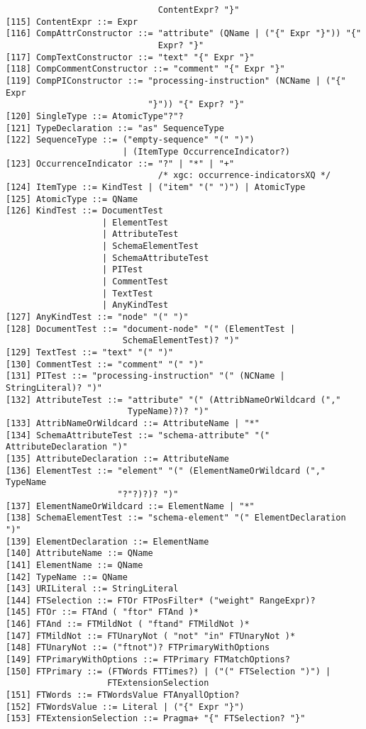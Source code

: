 \begin{verbatim}
                              ContentExpr? "}" 
[115] ContentExpr ::= Expr
[116] CompAttrConstructor ::= "attribute" (QName | ("{" Expr "}")) "{"
                              Expr? "}"  
[117] CompTextConstructor ::= "text" "{" Expr "}"
[118] CompCommentConstructor ::= "comment" "{" Expr "}"
[119] CompPIConstructor ::= "processing-instruction" (NCName | ("{" Expr
                            "}")) "{" Expr? "}" 
[120] SingleType ::= AtomicType"?"? 
[121] TypeDeclaration ::= "as" SequenceType
[122] SequenceType ::= ("empty-sequence" "(" ")")
                       | (ItemType OccurrenceIndicator?)
[123] OccurrenceIndicator ::= "?" | "*" | "+"	
                              /* xgc: occurrence-indicatorsXQ */
[124] ItemType ::= KindTest | ("item" "(" ")") | AtomicType
[125] AtomicType ::= QName
[126] KindTest ::= DocumentTest
                   | ElementTest
                   | AttributeTest
                   | SchemaElementTest
                   | SchemaAttributeTest
                   | PITest
                   | CommentTest
                   | TextTest
                   | AnyKindTest
[127] AnyKindTest ::= "node" "(" ")"
[128] DocumentTest ::= "document-node" "(" (ElementTest |
                       SchemaElementTest)? ")" 
[129] TextTest ::= "text" "(" ")"
[130] CommentTest ::= "comment" "(" ")"
[131] PITest ::= "processing-instruction" "(" (NCName | StringLiteral)? ")"
[132] AttributeTest ::= "attribute" "(" (AttribNameOrWildcard (","
                        TypeName)?)? ")"
[133] AttribNameOrWildcard ::= AttributeName | "*"
[134] SchemaAttributeTest ::= "schema-attribute" "(" AttributeDeclaration ")" 
[135] AttributeDeclaration ::= AttributeName
[136] ElementTest ::= "element" "(" (ElementNameOrWildcard ("," TypeName
                      "?"?)?)? ")" 
[137] ElementNameOrWildcard ::= ElementName | "*"
[138] SchemaElementTest ::= "schema-element" "(" ElementDeclaration ")"
[139] ElementDeclaration ::= ElementName
[140] AttributeName ::= QName
[141] ElementName ::= QName
[142] TypeName ::= QName
[143] URILiteral ::= StringLiteral
[144] FTSelection ::= FTOr FTPosFilter* ("weight" RangeExpr)?
[145] FTOr ::= FTAnd ( "ftor" FTAnd )*
[146] FTAnd ::= FTMildNot ( "ftand" FTMildNot )*
[147] FTMildNot ::= FTUnaryNot ( "not" "in" FTUnaryNot )*
[148] FTUnaryNot ::= ("ftnot")? FTPrimaryWithOptions
[149] FTPrimaryWithOptions ::= FTPrimary FTMatchOptions?
[150] FTPrimary ::= (FTWords FTTimes?) | ("(" FTSelection ")") |
                    FTExtensionSelection 
[151] FTWords ::= FTWordsValue FTAnyallOption?
[152] FTWordsValue ::= Literal | ("{" Expr "}")
[153] FTExtensionSelection ::= Pragma+ "{" FTSelection? "}"

\end{verbatim}
